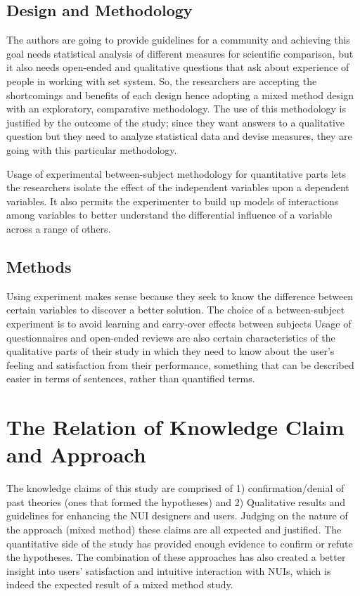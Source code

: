 \documentclass{sigchi}
\begin{document}
\subsection{Design and Methodology}
The authors are going to provide guidelines for a community and achieving this goal needs statistical analysis of different measures for scientific comparison, but it also needs open-ended and qualitative questions that ask about experience of people in working with set system. So, the researchers are accepting the shortcomings and benefits of each design hence adopting a mixed method design with an exploratory, comparative methodology. The use of this methodology is justified by the outcome of the study; since they want answers to a qualitative question but they need to analyze statistical data and devise measures, they are going with this particular methodology. 

Usage of experimental between-subject methodology for quantitative parts lets the researchers isolate the effect of the independent variables upon a dependent variables. It also permits the experimenter to build up models
of interactions among variables to better understand the differential influence of a variable across a range of others\cite{Gergle2014}.
\subsection{Methods}
Using experiment makes sense because they seek to know the difference between certain variables to discover a better solution. The choice of a between-subject experiment is to avoid learning and carry-over effects between subjects\cite{Gergle2014} Usage of questionnaires and open-ended reviews are also certain characteristics of the qualitative parts of their study in which they need to know about the user's feeling and satisfaction from their performance, something that can be described easier in terms of sentences, rather than quantified terms.

\section{The Relation of Knowledge Claim and Approach}
The knowledge claims of this study are comprised of 1) confirmation/denial of past theories (ones that formed the hypotheses) and 2) Qualitative results and guidelines for enhancing the NUI designers and users. Judging on the nature of the approach (mixed method) these claims are all expected and justified. The quantitative side of the study has provided enough evidence to confirm or refute the hypotheses. The combination of these approaches has also created a better insight into users' satisfaction and intuitive interaction with NUIs, which is indeed the expected result of a mixed method study.
\end{document}
